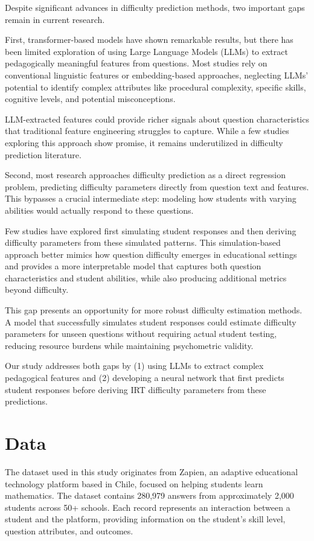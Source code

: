\documentclass[11pt]{article}
\begin{document}
Despite significant advances in difficulty prediction methods, two important gaps remain in current research.

First, transformer-based models have shown remarkable results, but there has been limited exploration of using Large Language Models (LLMs) to extract pedagogically meaningful features from questions. Most studies rely on conventional linguistic features or embedding-based approaches, neglecting LLMs' potential to identify complex attributes like procedural complexity, specific skills, cognitive levels, and potential misconceptions.

LLM-extracted features could provide richer signals about question characteristics that traditional feature engineering struggles to capture. While a few studies exploring this approach show promise, it remains underutilized in difficulty prediction literature.

Second, most research approaches difficulty prediction as a direct regression problem, predicting difficulty parameters directly from question text and features. This bypasses a crucial intermediate step: modeling how students with varying abilities would actually respond to these questions.

Few studies have explored first simulating student responses and then deriving difficulty parameters from these simulated patterns. This simulation-based approach better mimics how question difficulty emerges in educational settings and provides a more interpretable model that captures both question characteristics and student abilities, while also producing additional metrics beyond difficulty.

This gap presents an opportunity for more robust difficulty estimation methods. A model that successfully simulates student responses could estimate difficulty parameters for unseen questions without requiring actual student testing, reducing resource burdens while maintaining psychometric validity.

Our study addresses both gaps by (1) using LLMs to extract complex pedagogical features and (2) developing a neural network that first predicts student responses before deriving IRT difficulty parameters from these predictions.

\section{Data}

The dataset used in this study originates from Zapien, an adaptive educational technology platform based in Chile, focused on helping students learn mathematics. The dataset contains 280,979 answers from approximately 2,000 students across 50+ schools. Each record represents an interaction between a student and the platform, providing information on the student's skill level, question attributes, and outcomes.
\end{document}
